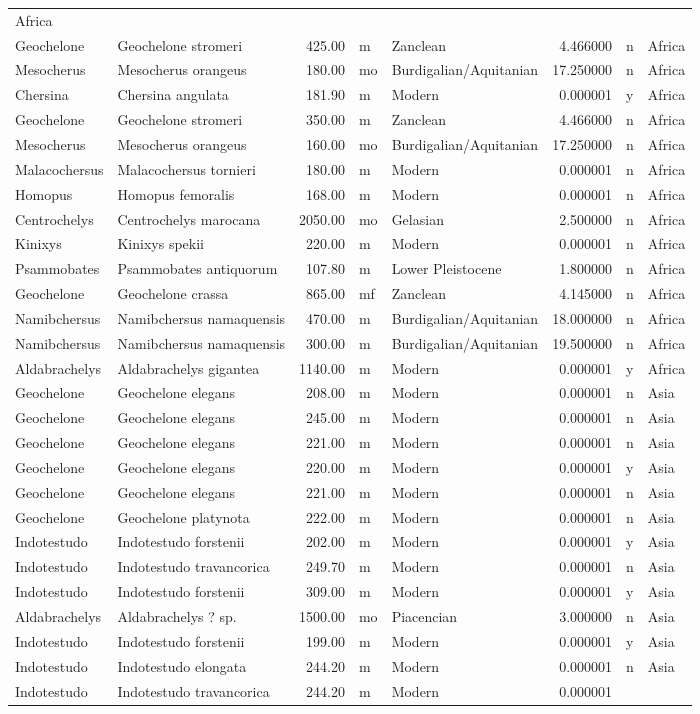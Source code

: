 \documentclass[]{article}
\begin{document}
\begin{longtable}[]{@{}llrllrll@{}}
Africa\tabularnewline
Geochelone & Geochelone stromeri & 425.00 & m & Zanclean & 4.466000 & n
& Africa\tabularnewline
Mesocherus & Mesocherus orangeus & 180.00 & mo & Burdigalian/Aquitanian
& 17.250000 & n & Africa\tabularnewline
Chersina & Chersina angulata & 181.90 & m & Modern & 0.000001 & y &
Africa\tabularnewline
Geochelone & Geochelone stromeri & 350.00 & m & Zanclean & 4.466000 & n
& Africa\tabularnewline
Mesocherus & Mesocherus orangeus & 160.00 & mo & Burdigalian/Aquitanian
& 17.250000 & n & Africa\tabularnewline
Malacochersus & Malacochersus tornieri & 180.00 & m & Modern & 0.000001
& n & Africa\tabularnewline
Homopus & Homopus femoralis & 168.00 & m & Modern & 0.000001 & n &
Africa\tabularnewline
Centrochelys & Centrochelys marocana & 2050.00 & mo & Gelasian &
2.500000 & n & Africa\tabularnewline
Kinixys & Kinixys spekii & 220.00 & m & Modern & 0.000001 & n &
Africa\tabularnewline
Psammobates & Psammobates antiquorum & 107.80 & m & Lower Pleistocene &
1.800000 & n & Africa\tabularnewline
Geochelone & Geochelone crassa & 865.00 & mf & Zanclean & 4.145000 & n &
Africa\tabularnewline
Namibchersus & Namibchersus namaquensis & 470.00 & m &
Burdigalian/Aquitanian & 18.000000 & n & Africa\tabularnewline
Namibchersus & Namibchersus namaquensis & 300.00 & m &
Burdigalian/Aquitanian & 19.500000 & n & Africa\tabularnewline
Aldabrachelys & Aldabrachelys gigantea & 1140.00 & m & Modern & 0.000001
& y & Africa\tabularnewline
Geochelone & Geochelone elegans & 208.00 & m & Modern & 0.000001 & n &
Asia\tabularnewline
Geochelone & Geochelone elegans & 245.00 & m & Modern & 0.000001 & n &
Asia\tabularnewline
Geochelone & Geochelone elegans & 221.00 & m & Modern & 0.000001 & n &
Asia\tabularnewline
Geochelone & Geochelone elegans & 220.00 & m & Modern & 0.000001 & y &
Asia\tabularnewline
Geochelone & Geochelone elegans & 221.00 & m & Modern & 0.000001 & n &
Asia\tabularnewline
Geochelone & Geochelone platynota & 222.00 & m & Modern & 0.000001 & n &
Asia\tabularnewline
Indotestudo & Indotestudo forstenii & 202.00 & m & Modern & 0.000001 & y
& Asia\tabularnewline
Indotestudo & Indotestudo travancorica & 249.70 & m & Modern & 0.000001
& n & Asia\tabularnewline
Indotestudo & Indotestudo forstenii & 309.00 & m & Modern & 0.000001 & y
& Asia\tabularnewline
Aldabrachelys & Aldabrachelys ? sp. & 1500.00 & mo & Piacencian &
3.000000 & n & Asia\tabularnewline
Indotestudo & Indotestudo forstenii & 199.00 & m & Modern & 0.000001 & y
& Asia\tabularnewline
Indotestudo & Indotestudo elongata & 244.20 & m & Modern & 0.000001 & n
& Asia\tabularnewline
Indotestudo & Indotestudo travancorica & 244.20 & m & Modern & 0.000001

\end{longtable}
\end{document}
